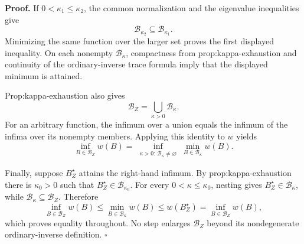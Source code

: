 \textbf{Proof.}
If \(0<\kappa_1\le\kappa_2\), the common normalization and the eigenvalue inequalities give
\[
\mathcal B_{\kappa_2}\subseteq\mathcal B_{\kappa_1}.
\]
Minimizing the same function over the larger set proves the first displayed inequality.  On each nonempty \(\mathcal B_\kappa\), compactness from prop:kappa-exhaustion and continuity of the ordinary-inverse trace formula imply that the displayed minimum is attained.

Prop:kappa-exhaustion also gives
\[
\mathcal B_Z=\bigcup_{\kappa>0}\mathcal B_\kappa.
\]
For an arbitrary function, the infimum over a union equals the infimum of the infima over its nonempty members.  Applying this identity to \(w\) yields
\[
\inf_{B\in\mathcal B_Z}w(B)
=
\inf_{\substack{\kappa>0:\,\mathcal B_\kappa\ne\varnothing}}
\min_{B\in\mathcal B_\kappa}w(B).
\]

Finally, suppose \(B_Z^\star\) attains the right-hand infimum.  By prop:kappa-exhaustion there is \(\kappa_0>0\) such that \(B_Z^\star\in\mathcal B_{\kappa_0}\).  For every \(0<\kappa\le\kappa_0\), nesting gives \(B_Z^\star\in\mathcal B_\kappa\), while \(\mathcal B_\kappa\subseteq\mathcal B_Z\).  Therefore
\[
\inf_{B\in\mathcal B_Z}w(B)
\le
\min_{B\in\mathcal B_\kappa}w(B)
\le
w(B_Z^\star)
=
\inf_{B\in\mathcal B_Z}w(B),
\]
which proves equality throughout.  No step enlarges \(\mathcal B_Z\) beyond its nondegenerate ordinary-inverse definition. \(\square\)